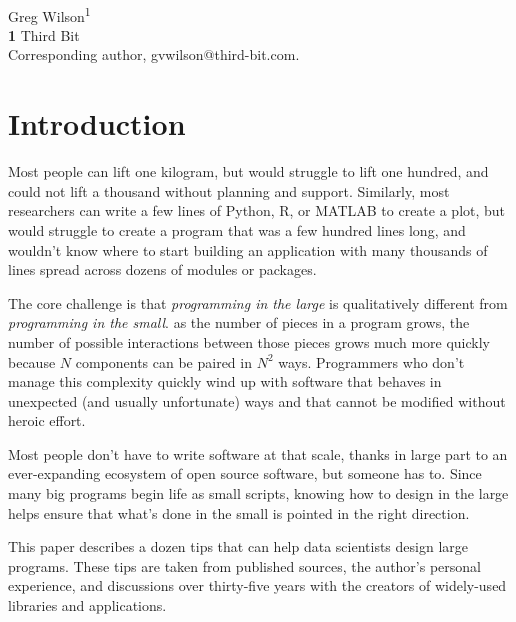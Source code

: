 \documentclass[10pt,letterpaper]{article}
\begin{document}
\vspace*{0.2in}

\begin{flushleft}
{\Large
\textbf{}
}
\newline
\\
{Greg Wilson}\textsuperscript{1{\ddag}}
\\
\bigskip
\textbf{1} Third Bit\\
{\ddag} Corresponding author, gvwilson@third-bit.com.
\end{flushleft}

\section*{Introduction}

Most people can lift one kilogram,
but would struggle to lift one hundred,
and could not lift a thousand without planning and support.
Similarly,
most researchers can write a few lines of Python, R, or MATLAB to create a plot,
but would struggle to create a program that was a few hundred lines long,
and wouldn't know where to start building an application with many thousands of lines
spread across dozens of modules or packages.

The core challenge is that
\emph{programming in the large} is qualitatively different from \emph{programming in the small}.
as the number of pieces in a program grows,
the number of possible interactions between those pieces grows much more quickly
because $N$ components can be paired in $N^2$ ways.
Programmers who don't manage this complexity
quickly wind up with software that behaves in unexpected (and usually unfortunate) ways
and that cannot be modified without heroic effort.

Most people don't have to write software at that scale,
thanks in large part to an ever-expanding ecosystem of open source software,
but someone has to.
Since many big programs begin life as small scripts,
knowing how to design in the large helps ensure that what's done in the small
is pointed in the right direction.

This paper describes a dozen tips that can help data scientists design large programs.
These tips are taken from published sources,
the author's personal experience,
and discussions over thirty-five years with the creators of widely-used libraries and applications.
\end{document}
